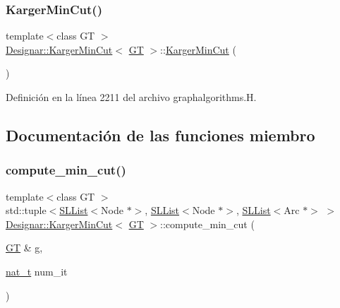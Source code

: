 \subsubsection{\texorpdfstring{Karger\+Min\+Cut()}{KargerMinCut()}\hspace{0.1cm}{\footnotesize\ttfamily [2/2]}}
{\footnotesize\ttfamily template$<$class GT $>$ \\
\hyperlink{class_designar_1_1_karger_min_cut}{Designar\+::\+Karger\+Min\+Cut}$<$ \hyperlink{demo-buildgraph_8_c_a3001c40d2c31ca87ed96cd7d1334a55e}{GT} $>$\+::\hyperlink{class_designar_1_1_karger_min_cut}{Karger\+Min\+Cut} (\begin{DoxyParamCaption}{ }\end{DoxyParamCaption})\hspace{0.3cm}{\ttfamily [inline]}}



Definición en la línea 2211 del archivo graphalgorithms.\+H.



\subsection{Documentación de las funciones miembro}
\mbox{\label{class_designar_1_1_karger_min_cut_a62479a7ca1e7202a93cded87a9d09b8b}} 
\subsubsection{\texorpdfstring{compute\+\_\+min\+\_\+cut()}{compute\_min\_cut()}\hspace{0.1cm}{\footnotesize\ttfamily [1/2]}}
{\footnotesize\ttfamily template$<$class GT $>$ \\
std\+::tuple$<$\hyperlink{class_designar_1_1_s_l_list}{S\+L\+List}$<$Node $\ast$$>$, \hyperlink{class_designar_1_1_s_l_list}{S\+L\+List}$<$Node $\ast$$>$, \hyperlink{class_designar_1_1_s_l_list}{S\+L\+List}$<$Arc $\ast$$>$ $>$ \hyperlink{class_designar_1_1_karger_min_cut}{Designar\+::\+Karger\+Min\+Cut}$<$ \hyperlink{demo-buildgraph_8_c_a3001c40d2c31ca87ed96cd7d1334a55e}{GT} $>$\+::compute\+\_\+min\+\_\+cut (\begin{DoxyParamCaption}\item[{\hyperlink{demo-buildgraph_8_c_a3001c40d2c31ca87ed96cd7d1334a55e}{GT} \&}]{g,  }\item[{\hyperlink{namespace_designar_aa72662848b9f4815e7bf31a7cf3e33d1}{nat\+\_\+t}}]{num\+\_\+it }\end{DoxyParamCaption})\hspace{0.3cm}{\ttfamily [inline]}}



